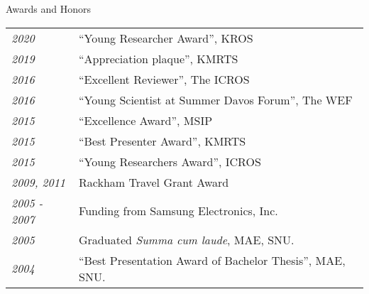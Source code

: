 \begin{rSection}{Awards and Honors}
    \begin{tabular}{ @{} >{\itshape}l @{\hspace{6ex}} l }
    2020        & ``Young Researcher Award'', \ac{KROS}\\
    2019        & ``Appreciation plaque'', \ac{KMRTS}\\
    2016        & ``Excellent Reviewer'', The \ac{ICROS} \\
    2016        & ``Young Scientist at Summer Davos Forum'', The \ac{WEF} \\
    2015        & ``Excellence Award'', \ac{MSIP} \\
    2015        & ``Best Presenter Award'', \ac{KMRTS}\\
    2015        & ``Young Researchers Award'', \ac{ICROS} \\
    2009, 2011  & Rackham Travel Grant Award\\
    2005 - 2007 & Funding from Samsung Electronics, Inc. \\
    2005        & Graduated {\em Summa cum laude}, MAE, SNU. \\
    2004        & ``Best Presentation Award of Bachelor Thesis'', MAE, SNU. \\
    \end{tabular}
\end{rSection}
